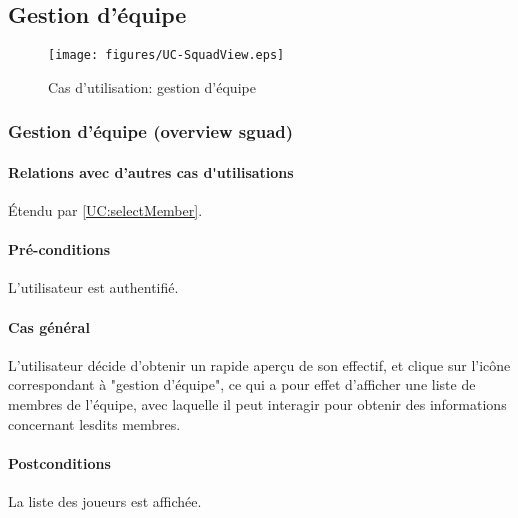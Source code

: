 

\subsection{Gestion d'équipe}

\begin{figure}[h]
  \centering
  \texttt{[image: figures/UC-SquadView.eps]}
  \caption{\label{fig:UC:SquadView} Cas d'utilisation: gestion d'équipe}
\end{figure}

\subsubsection{Gestion d'équipe (overview sguad)}
\label{UC:squadView}
\paragraph{Relations avec d'autres \gls{cas d'utilisation}s}
Étendu par \ref{UC:selectMember}.
\paragraph{Pré-conditions}
\begin{list}{}{\leftmargin=1.5em}
\item{L'\gls{utilisateur} est authentifié.}
\end{list}
\paragraph{Cas général}
L'utilisateur décide d'obtenir un rapide aperçu de son effectif, et clique sur l'icône correspondant à "gestion d'équipe", ce qui a pour effet d'afficher une liste de membres de l'équipe, avec laquelle il peut interagir pour obtenir des informations concernant lesdits membres.
\paragraph{Postconditions} La liste des joueurs est affichée.

